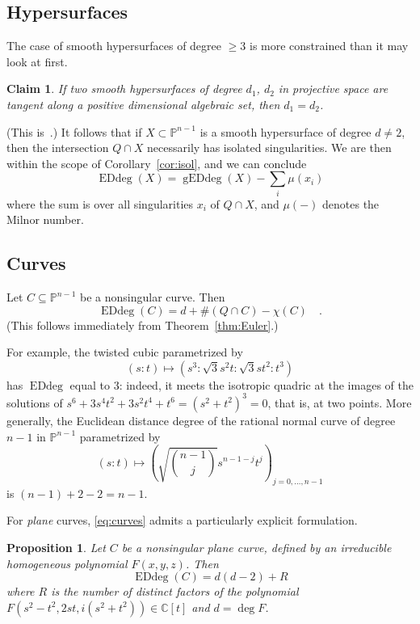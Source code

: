 \documentclass[11pt]{amsart}
\newtheorem{prop}[theorem]{Proposition}
\newtheorem{claim}[theorem]{Claim}
\numberwithin{equation}{section}
\newcommand{\Cbb}{{\mathbb{C}}}
\newcommand{\Pbb}{{\mathbb{P}}}
\DeclareMathOperator{\Edd}{EDdeg}
\DeclareMathOperator{\gEdd}{gEDdeg}
\begin{document}
\subsection{Hypersurfaces}\label{ss:hyper}
The case of smooth hypersurfaces of degree $\ge 3$ is more constrained than it
may look at first.

\begin{claim}\label{cla:32}
If two smooth hypersurfaces of degree $d_1$, $d_2$ in projective space are tangent
along a positive dimensional algebraic set, then $d_1=d_2$.
\end{claim}

(This is~\cite[Claim~3.2]{MR1819626}.)
It follows that if $X\subset \Pbb^{n-1}$ is a smooth hypersurface of degree $d\ne 2$, 
then the intersection $Q\cap X$ necessarily has isolated singularities. We are then within
the scope of Corollary~\ref{cor:isol}, and we can conclude
\[
\Edd(X) = \gEdd(X) - \sum_i \mu(x_i)
\]
where the sum is over all singularities $x_i$ of $Q\cap X$, and $\mu(-)$ denotes the 
Milnor number.

\subsection{Curves}\label{ss:curves}
Let $C\subseteq \Pbb^{n-1}$ be a nonsingular curve. Then
\begin{equation}\label{eq:curves}
\Edd(C) = d + \#(Q\cap C) - \chi(C)\quad.
\end{equation}
(This follows immediately from Theorem~\ref{thm:Euler}.)

For example, the twisted cubic parametrized by
\[
(s:t) \mapsto (s^3:\sqrt 3 s^2 t : \sqrt 3 s t^2 : t^3)
\]
has $\Edd$ equal to $3$: indeed, it meets the isotropic quadric at the images of
the solutions of $s^6 + 3 s^4 t^2 + 3 s^2 t^4 + t^6=(s^2+t^2)^3=0$, that is, at two 
points. More generally, the Euclidean distance degree of the rational normal curve 
of degree $n-1$ in $\Pbb^{n-1}$ parametrized by
\[
(s:t) \mapsto \left( \sqrt{\binom {n-1}j} s^{n-1-j} t^j\right)_{j=0,\dots,n-1}
\]
is $(n-1)+2-2=n-1$.

For {\em plane\/} curves, \eqref{eq:curves} admits a particularly explicit formulation.

\begin{prop}\label{prop:planec}
Let $C$ be a nonsingular plane curve, defined by an irreducible homogeneous 
polynomial $F(x,y,z)$. Then
\[
\Edd(C) = d(d-2) + R
\]
where $R$ is the number of distinct factors of the polynomial
$F(s^2-t^2,2st,i(s^2+t^2))\in \Cbb[t]$ and $d=\deg F$.
\end{prop}
\end{document}
